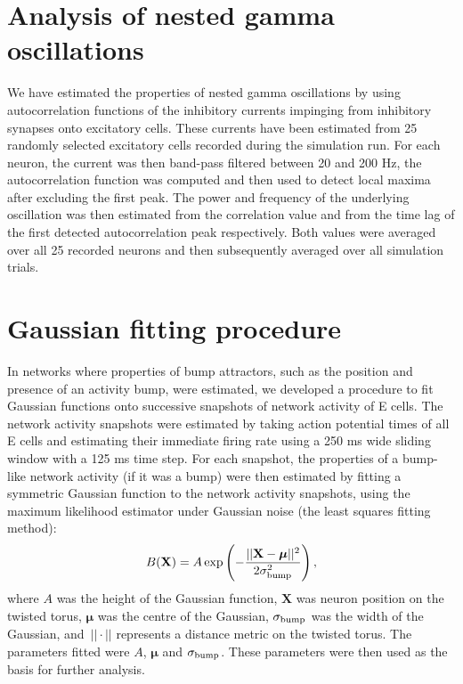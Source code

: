 \documentclass[a4paper,12pt]{article}
\newcommand{\ssc}[3]{\ensuremath{#1_{\text{#2}_{\text{#3}}}}}
\newcommand{\sigmasub}[1]{\ssc{\sigma}{\scriptsize{#1}}{}}
\begin{document}
\section{Analysis of nested gamma oscillations}

We have estimated the properties of nested gamma oscillations by using
autocorrelation functions of the inhibitory currents impinging from inhibitory
synapses onto excitatory cells. These currents have been estimated from 25
randomly selected excitatory cells recorded during the simulation run.
For each neuron, the current was then band-pass filtered between 20 and 200 Hz,
the autocorrelation function was computed and then used to detect local maxima
after excluding the first peak. The power and frequency of the underlying oscillation was then
estimated from the correlation value and from the time lag of the first detected
autocorrelation peak respectively. Both values were averaged over all 25 recorded neurons
and then subsequently averaged over all simulation trials.

\section{Gaussian fitting procedure} \label{sec:gauss_fitting}

In networks where properties of bump attractors, such as the position and
presence of an activity bump, were estimated, we developed a procedure to fit
Gaussian functions onto successive snapshots of network activity of E cells.
The network activity snapshots were estimated by taking action potential times
of all E cells and estimating their immediate firing rate using a 250 ms wide
sliding window with a 125 ms time step. For each snapshot, the properties of a
bump-like network activity (if it was a bump) were then estimated by fitting a
symmetric Gaussian function to the network activity snapshots, using the
maximum likelihood estimator under Gaussian noise (the least squares
fitting method):
\begin{equation}
    B(\mathbf{X}) = A \exp\left(
        -\frac{||\mathbf{X} - \bm{\mu}||^2}{2\sigmasub{bump}^2} \right),
    \label{eq:noise_bump_fitting}
\end{equation}
where $A$ was the height of the Gaussian function, $\mathbf{X}$ was neuron position
on the twisted torus, $\bm{\mu}$ was the centre of the Gaussian,
$\sigmasub{bump}$ was the width of the Gaussian, and~$||\cdot||$ represents a
distance metric on the twisted torus. The parameters fitted were $A$,
$\bm{\mu}$ and $\sigmasub{bump}$. These parameters were then used as the basis
for further analysis.
\end{document}
